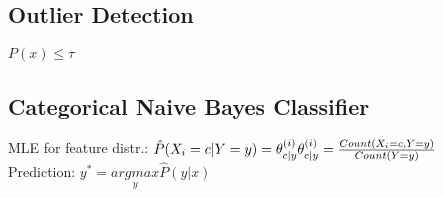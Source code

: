 \subsection*{Outlier Detection}
$P(x) \leq \tau$

\subsection*{Categorical Naive Bayes Classifier}
MLE for feature distr.:
$\hat{P}(X_i = c|Y = y) = \theta_{c|y}^{(i)}\\
\theta_{c|y}^{(i)} = \frac{Count(X_i = c, Y = y)}{Count(Y=y)}$\\
Prediction: $y^* = \underset{y}{argmax}\hat{P}(y|x)$